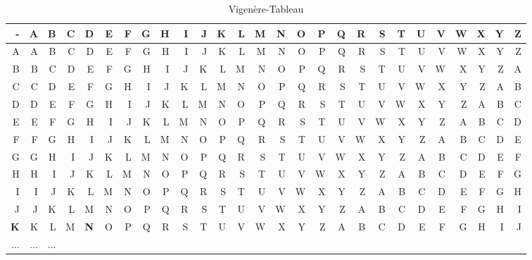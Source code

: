 \begin{refsegment}
\begin{itemize}
\begin{table}[ht]
   {
   \textmd \small
   \begin{center}
   \begin{tabular}{|@{\:}r@{\:}@{\:}|r@{\:}r@{\:}r@{\:}r@{\:}r@{\:}r@{\:}r@{\:}r@{\:}r@{\:}r@{\:}r@{\:}r@{\:}r@{\:}r@{\:}r@{\:}r@{\:}r@{\:}r@{\:}r@{\:}r@{\:}r@{\:}r@{\:}r@{\:}r@{\:}r@{\:}r@{\:}|}
   \hline
	- & A & B & C & \textbf{D} & E & F & G & H & I & J & K & L & M & N & O & P & Q & R & S & T & U & V & W & X & Y & Z\\
   \hline
	A & A & B & C & D & E & F & G & H & I & J & K & L & M & N & O & P & Q & R & S & T & U & V & W & X & Y & Z\\
	B & B & C & D & E & F & G & H & I & J & K & L & M & N & O & P & Q & R & S & T & U & V & W & X & Y & Z & A\\
	C & C & D & E & F & G & H & I & J & K & L & M & N & O & P & Q & R & S & T & U & V & W & X & Y & Z & A & B\\
	D & D & E & F & G & H & I & J & K & L & M & N & O & P & Q & R & S & T & U & V & W & X & Y & Z & A & B & C\\
	E & E & F & G & H & I & J & K & L & M & N & O & P & Q & R & S & T & U & V & W & X & Y & Z & A & B & C & D\\
	F & F & G & H & I & J & K & L & M & N & O & P & Q & R & S & T & U & V & W & X & Y & Z & A & B & C & D & E\\
	G & G & H & I & J & K & L & M & N & O & P & Q & R & S & T & U & V & W & X & Y & Z & A & B & C & D & E & F\\
	H & H & I & J & K & L & M & N & O & P & Q & R & S & T & U & V & W & X & Y & Z & A & B & C & D & E & F & G\\
	I & I & J & K & L & M & N & O & P & Q & R & S & T & U & V & W & X & Y & Z & A & B & C & D & E & F & G & H\\
	J & J & K & L & M & N & O & P & Q & R & S & T & U & V & W & X & Y & Z & A & B & C & D & E & F & G & H & I\\
	\textbf{K} & K & L & M & \textbf{N} & O & P & Q & R & S & T & U & V & W & X & Y & Z & A & B & C & D & E & F & G & H & I & J\\
	... & ... & ... &   &   &   &   &   &   &   &   &   &   &   &   &   &   &   &   &   &   &   &   &   &   &   &  \\
   \hline
   \end{tabular}
   \caption{Vigen\`ere-Tableau}
   \label{Vigenere-table-reference}
   \end{center}
   }

   \end{table}



\end{itemize}
\end{refsegment}
